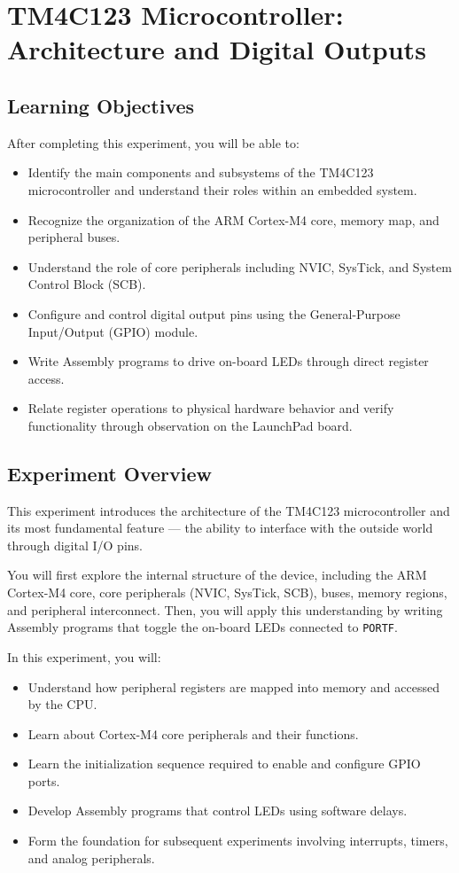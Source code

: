 \chapter{TM4C123 Microcontroller: Architecture and Digital Outputs}

\section*{Learning Objectives}
After completing this experiment, you will be able to:
\begin{itemize}[nosep]
  \item Identify the main components and subsystems of the TM4C123 microcontroller and understand their roles within an embedded system.
  \item Recognize the organization of the ARM Cortex-M4 core, memory map, and peripheral buses.
  \item Understand the role of core peripherals including NVIC, SysTick, and System Control Block (SCB).
  \item Configure and control digital output pins using the General-Purpose Input/Output (GPIO) module.
  \item Write Assembly programs to drive on-board LEDs through direct register access.
  \item Relate register operations to physical hardware behavior and verify functionality through observation on the LaunchPad board.
\end{itemize}

\section*{Experiment Overview}
This experiment introduces the architecture of the TM4C123 microcontroller and its most fundamental feature — the ability to interface with the outside world through digital I/O pins.

\noindent You will first explore the internal structure of the device, including the ARM Cortex-M4 core, core peripherals (NVIC, SysTick, SCB), buses, memory regions, and peripheral interconnect. Then, you will apply this understanding by writing Assembly programs that toggle the on-board LEDs connected to \texttt{PORTF}.

\noindent In this experiment, you will:
\begin{itemize}[nosep]
  \item Understand how peripheral registers are mapped into memory and accessed by the CPU.
  \item Learn about Cortex-M4 core peripherals and their functions.
  \item Learn the initialization sequence required to enable and configure GPIO ports.
  \item Develop Assembly programs that control LEDs using software delays.
  \item Form the foundation for subsequent experiments involving interrupts, timers, and analog peripherals.
\end{itemize}

